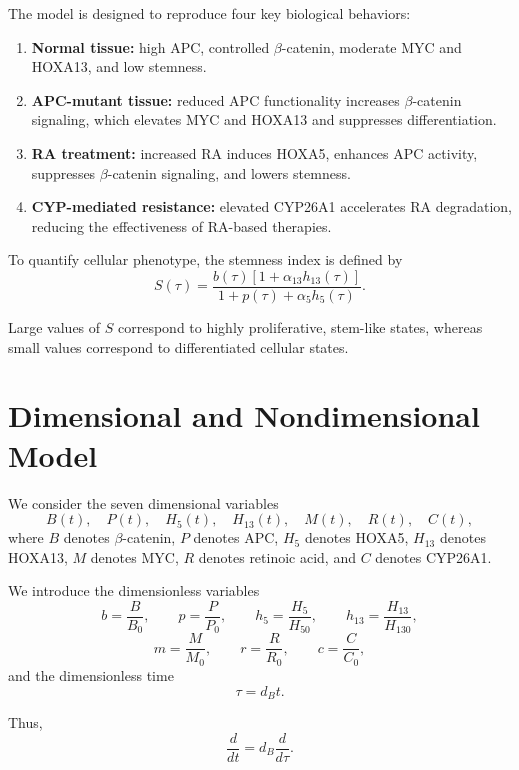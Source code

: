 \documentclass[11pt]{article}
\begin{document}
The model is designed to reproduce four key biological behaviors:

\begin{enumerate}
\item \textbf{Normal tissue:} high APC, controlled $\beta$-catenin, moderate MYC and HOXA13, and low stemness.

\item \textbf{APC-mutant tissue:} reduced APC functionality increases $\beta$-catenin signaling, which elevates MYC and HOXA13 and suppresses differentiation.

\item \textbf{RA treatment:} increased RA induces HOXA5, enhances APC activity, suppresses $\beta$-catenin signaling, and lowers stemness.

\item \textbf{CYP-mediated resistance:} elevated CYP26A1 accelerates RA degradation, reducing the effectiveness of RA-based therapies.
\end{enumerate}

To quantify cellular phenotype, the stemness index is defined by
\begin{equation}
S(\tau)
=
\frac{
b(\tau)\left[1+\alpha_{13}h_{13}(\tau)\right]
}
{
1+p(\tau)+\alpha_5h_5(\tau)
}.
\end{equation}

Large values of $S$ correspond to highly proliferative, stem-like states,
whereas small values correspond to differentiated cellular states.



\newpage

\section{Dimensional and Nondimensional Model}

We consider the seven dimensional variables
\[
B(t),\quad P(t),\quad H_5(t),\quad H_{13}(t),\quad M(t),\quad R(t),\quad C(t),
\]
where \(B\) denotes \(\beta\)-catenin, \(P\) denotes APC, \(H_5\) denotes HOXA5, \(H_{13}\) denotes HOXA13, \(M\) denotes MYC, \(R\) denotes retinoic acid, and \(C\) denotes CYP26A1.

We introduce the dimensionless variables
\[
b=\frac{B}{B_0},\qquad
p=\frac{P}{P_0},\qquad
h_5=\frac{H_5}{H_{50}},\qquad
h_{13}=\frac{H_{13}}{H_{130}},
\]
\[
m=\frac{M}{M_0},\qquad
r=\frac{R}{R_0},\qquad
c=\frac{C}{C_0},
\]
and the dimensionless time
\[
\tau=d_B t.
\]

Thus,
\[
\frac{d}{dt}=d_B\frac{d}{d\tau}.
\]
\end{document}
